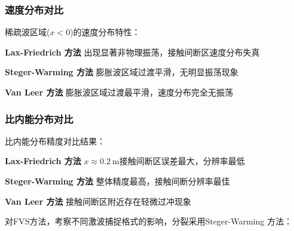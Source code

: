 \documentclass[12pt,a4paper]{article}
\begin{document}
\subsubsection{速度分布对比}
稀疏波区域($x < 0$)的速度分布特性：

\textbf{Lax-Friedrich 方法}
出现显著非物理振荡，接触间断区速度分布失真

\textbf{Steger-Warming 方法}
膨胀波区域过渡平滑，无明显振荡现象

\textbf{Van Leer 方法}
膨胀波区域过渡最平滑，速度分布完全无振荡

\subsubsection{比内能分布对比}
比内能分布精度对比结果：

\textbf{Lax-Friedrich 方法}
$x \approx \SI{0.2}{\meter}$接触间断区误差最大，分辨率最低

\textbf{Steger-Warming 方法}
整体精度最高，接触间断分辨率最佳

\textbf{Van Leer 方法}
接触间断区附近存在轻微过冲现象

对FVS方法，考察不同激波捕捉格式的影响，分裂采用Steger-Warming 方法：
\end{document}
